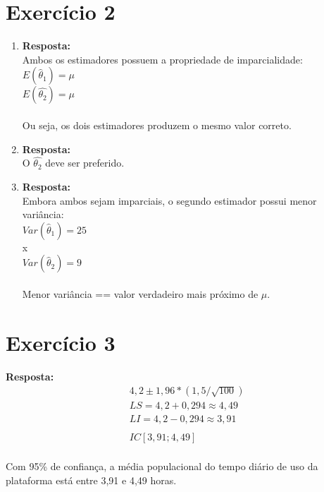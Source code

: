 \documentclass[11pt, a4paper]{article}
\begin{document}
\section{Exercício 2}
\begin{enumerate}[label=\alph*)]
    \item \textbf{Resposta:}\\
    Ambos os estimadores possuem a propriedade de imparcialidade:\\
    $E(\hat{\theta}_1) = \mu$\\$E(\hat{\theta_2}) = \mu$\\
    \\Ou seja, os dois estimadores produzem o mesmo valor correto.
    
    \item \textbf{Resposta:}\\
    O $\hat{\theta_2}$ deve ser preferido.
    
    \item \textbf{Resposta:}\\
    Embora ambos sejam imparciais, o segundo estimador possui menor variância:\\
    $Var(\hat{\theta}_1) = 25$\\x\\$Var(\hat{\theta}_2) = 9$\\
    \\Menor variância == valor verdadeiro mais próximo de $\mu$.
    
\end{enumerate}

\section{Exercício 3}
\textbf{Resposta:}
\begin{align*}
    &4,2 \pm 1,96 * (1,5/\sqrt{100})\\
    &LS = 4,2 + 0,294 \approx 4,49\\
    &LI = 4,2 - 0,294 \approx 3,91\\
    \\&IC[3,91;4,49]\\
\end{align*}

Com 95\% de confiança, a média populacional do tempo diário de uso da plataforma está entre 3,91 e 4,49 horas.
\end{document}
